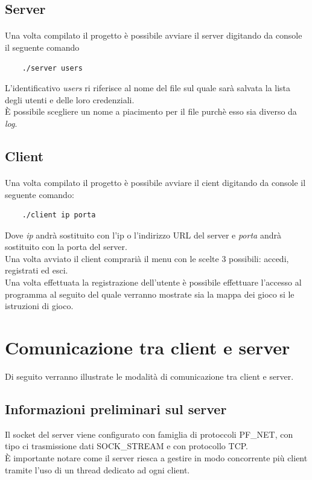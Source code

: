 \documentclass[a4paper]{article}
\begin{document}
\subsection{Server}
\paragraph{}
Una volta compilato il progetto è possibile avviare il server digitando da console il seguente comando
\begin{verbatim}
    ./server users
\end{verbatim}
L'identificativo \textit{users} ri riferisce al nome del file sul quale sarà salvata la lista degli utenti e delle loro credenziali.\\
È possibile scegliere un nome a piacimento per il file purchè esso sia diverso da \textit{log}.
\subsection{Client}
\paragraph{}
Una volta compilato il progetto è possibile avviare il cient digitando da console il seguente comando:
\begin{verbatim}
    ./client ip porta
\end{verbatim}
Dove \textit{ip} andrà sostituito con l'ip o l'indirizzo URL del server e \textit{porta} andrà sostituito con la porta del server.\\
Una volta avviato il client comprarià il menu con le scelte 3 possibili: accedi, registrati ed esci.\\
Una volta effettuata la registrazione dell'utente è possibile effettuare l'accesso al programma al seguito del quale verranno mostrate sia la mappa dei gioco si le istruzioni di gioco.
\pagebreak
\section{Comunicazione tra client e server}
Di seguito verranno illustrate le modalità di comunicazione tra client e server.
\subsection{Informazioni preliminari sul server}
Il socket del server viene configurato con famiglia di protoccoli PF\_NET, con tipo ci trasmissione dati SOCK\_STREAM e con protocollo TCP.\\
È importante notare come il server riesca a gestire in modo concorrente più client tramite l'uso di un thread dedicato ad ogni client.
\end{document}
